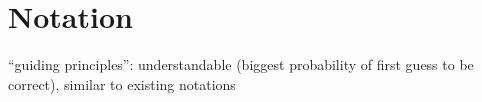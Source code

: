 \section{Notation}
\label{sec:notation}



``guiding principles'': understandable (biggest probability of first guess to be correct), similar to existing notations~\cite{GraphBLASv13}





